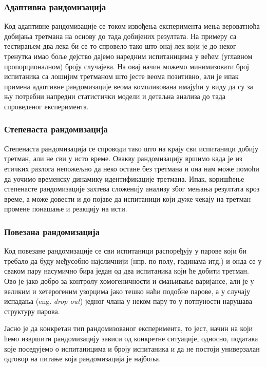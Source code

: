 \documentclass[12pt, a4paper]{article}
\begin{document}
\subsubsection*{Адаптивна рандомизација}

Код адаптивне рандомизације се током извођења експеримента мења вероватноћа добијања третмана на 
основу до тада добијених резултата. На примеру са тестирањем два лека би се то спровело тако што 
онај лек који је до неког тренутка имао боље дејство дајемо наредним испитаницима у већем 
(углавном пропорционалном) броју случајева. На овај начин можемо минимизовати број испитаника са 
лошијим третманом што јесте веома позитивно, али је ипак примена адаптивне рандомизације веома 
компликована имајући у виду да су за њу потребни напредни статистички модели и детаљна анализа 
до тада спроведеног експеримента.

\subsubsection*{Степенаста рандомизација}

Степенаста рандомизација се спроводи тако што на крају сви испитаници добију третман, али не сви 
у исто време. Овакву рандомизацију вршимо када је из етичких разлога непожељно да неко остане без 
третмана и она нам може помоћи да уочимо временску динамику идентификације третмана. 
Ипак, коришћење степенасте рандомизације захтева сложенију анализу због мењања резултата кроз 
време, а може довести и до појаве да испитаници који дуже чекају на третман промене понашање и 
реакцију на исти. 

\subsubsection*{Повезана рандомизација}

Код повезане рандомизације се сви испитаници распоређују у парове који би требало да буду 
међусобно најсличнији (нпр. по полу, годинама итд.) и онда се у сваком пару насумично бира један од два испитаника који ће добити третман.
Ово је јако добро за контролу хомогеничности и смањивање варијансе, али је у великим и 
хетерогеним узорцима јако тешко наћи подобне парове, а у случају испадања (eng. \textit{drop out}) 
једног члана у неком пару то у потпуности нарушава структуру парова. 

Јасно је да конкретан тип рандомизованог експеримента, то јест, начин на који ћемо извршити 
рандомизацију зависи од конкретне ситуације, односно, података које поседујемо о испитаницима и 
броју испитаника и да не постоји универзалан одговор на питање која рандомизација је најбоља.
\end{document}
